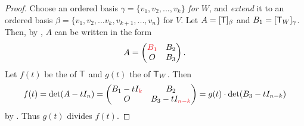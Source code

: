 \begin{proof}
Choose an ordered basis \(\gamma = \{ v_1, v_2, ..., v_k \}\) \emph{for \(W\)}, and \emph{extend} it to an ordered basis \(\beta = \{ v_1, v_2, ... v_k, v_{k + 1}, ..., v_n \}\) for \(V\).
Let \(A = [\textsf{T}]_{\beta}\) and \(B_1 = [\textsf{T}_W]_{\gamma}\).
Then, by , \(A\) can be written in the form
\[
    A = \begin{pmatrix}
        \RED{B_1} & B_2 \\ O & B_3
    \end{pmatrix}.
\]
Let \(f(t)\) be the \CPOLY{} of \(\textsf{T}\) and \(g(t)\) the \CPOLY{} of \(\textsf{T}_W\).
Then
\[
    f(t) = \det(A - tI_n) = \begin{pmatrix} B_1 - t I_{\RED{k}} & B_2 \\ O & B_3 - t I_{\RED{n - k}} \end{pmatrix}
    = g(t) \cdot \det(B_3 - t I_{n - k})
\]
by .
Thus \(g(t)\) divides \(f(t)\).
\end{proof}

